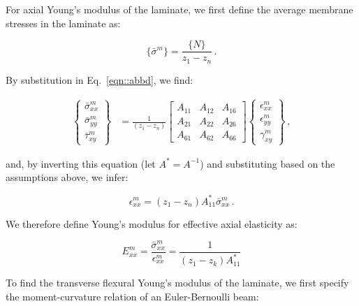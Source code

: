 \documentclass[twocolumn, linenumbers, superscriptaddress]{revtex4-1}
\begin{document}
				For axial Young's modulus of the laminate, we first define the average membrane stresses in the laminate as:
				
				\begin{equation}
					\{\bar{\sigma}^m\} = \frac{\{N\}}{z_1 - z_n}\,.
				\end{equation}
				
				By substitution in Eq.~\ref{eqn::abbd}, we find:
				
				\begin{equation}
					\begin{aligned}
						\begin{Bmatrix}
							\bar{\sigma}^m_{xx} \\
							\bar{\sigma}^m_{yy} \\
							\bar{\tau}^m_{xy}
						\end{Bmatrix}
						& = \frac{1}{(z_1 - z_n)}
						\begin{bmatrix}
							A_{11} & A_{12} & A_{16} \\
							A_{21} & A_{22} & A_{26} \\
							A_{61} & A_{62} & A_{66}
						\end{bmatrix}
						\begin{Bmatrix}
							\epsilon^m_{xx} \\
							\epsilon^m_{yy} \\
							\gamma^m_{xy}
						\end{Bmatrix}\,,
					\end{aligned}
				\end{equation}
				
				and, by inverting this equation (let $A^* = A^{-1}$) and substituting based on the assumptions above, we infer:
				
				\begin{equation}
					\epsilon^m_{xx} = (z_1 - z_n)A^{*}_{11}\bar{\sigma}^m_{xx}\,.
				\end{equation}
				
				We therefore define Young's modulus for effective axial elasticity as:
				
				\begin{equation}
					E^m_{xx} = \frac{\bar{\sigma}^m_{xx}}{\epsilon^m_{xx}} = \frac{1}{(z_1 - z_k)A^*_{11}}
				\end{equation}
				
				To find the transverse flexural Young's modulus of the laminate, we first specify the moment-curvature relation of an Euler-Bernoulli beam:
				
\end{document}
